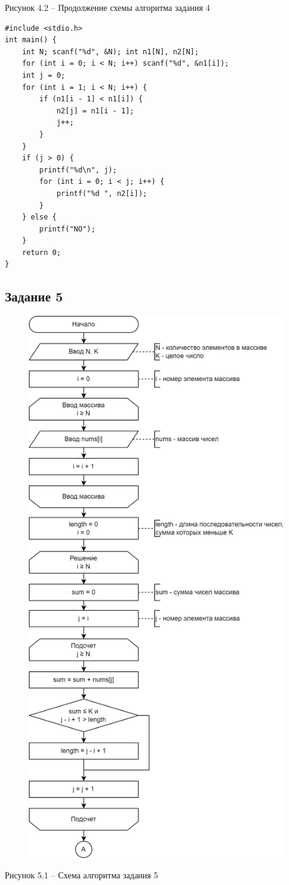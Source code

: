 \documentclass[a4paper,14pt]{extarticle}
\begin{document}
	\begin{center}
		Рисунок 4.2 – Продолжение схемы алгоритма задания 4
	\end{center}
	\begin{lstlisting}[tabsize=2,basicstyle=\ttfamily]
#include <stdio.h>
int main() {
	int N; scanf("%d", &N); int n1[N], n2[N];
	for (int i = 0; i < N; i++) scanf("%d", &n1[i]);
	int j = 0;
	for (int i = 1; i < N; i++) {
		if (n1[i - 1] < n1[i]) {
			n2[j] = n1[i - 1];
			j++;
		}
	}
	if (j > 0) {
		printf("%d\n", j);
		for (int i = 0; i < j; i++) {
			printf("%d ", n2[i]);
		}
	} else {
		printf("NO");
	}
	return 0;
}
	\end{lstlisting}
	
	\newpage
	\subsection*{Задание 5}
	\begin{figure}[h]
		\centering
		\includegraphics[width=0.55\linewidth]{schemes/s-5-1}
	\end{figure}
	\begin{center}
		Рисунок 5.1 – Схема алгоритма задания 5
	\end{center}
\end{document}
